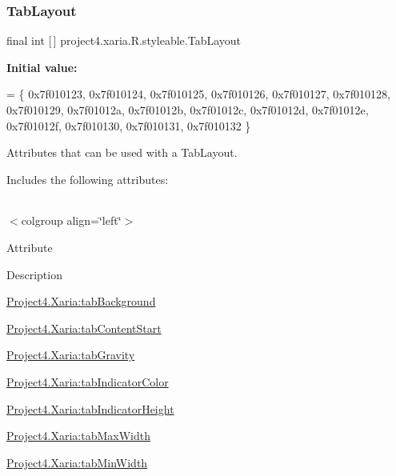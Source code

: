 \subsubsection{\texorpdfstring{Tab\+Layout}{TabLayout}}
{\footnotesize\ttfamily final int \mbox{[}$\,$\mbox{]} project4.\+xaria.\+R.\+styleable.\+Tab\+Layout\hspace{0.3cm}{\ttfamily [static]}}

{\bfseries Initial value\+:}
\begin{DoxyCode}
= \{
            0x7f010123, 0x7f010124, 0x7f010125, 0x7f010126,
            0x7f010127, 0x7f010128, 0x7f010129, 0x7f01012a,
            0x7f01012b, 0x7f01012c, 0x7f01012d, 0x7f01012e,
            0x7f01012f, 0x7f010130, 0x7f010131, 0x7f010132
        \}
\end{DoxyCode}
Attributes that can be used with a Tab\+Layout. 

Includes the following attributes\+:

\tabulinesep=1mm
\begin{longtabu} spread 0pt [c]{*{0}{|X[-1]}|}
\hline
\end{longtabu}
$<$colgroup align=\char`\"{}left\char`\"{}$>$ 

Attribute

Description 

{\ttfamily \hyperlink{classproject4_1_1xaria_1_1R_1_1styleable_a548353c43398409fd3c9188c927aad79}{Project4.\+Xaria\+:tab\+Background}}

{\ttfamily \hyperlink{classproject4_1_1xaria_1_1R_1_1styleable_ab07111454d6d47d52b6dd2500f672524}{Project4.\+Xaria\+:tab\+Content\+Start}}

{\ttfamily \hyperlink{classproject4_1_1xaria_1_1R_1_1styleable_a8c418d804b5e15d65312566231ca7340}{Project4.\+Xaria\+:tab\+Gravity}}

{\ttfamily \hyperlink{classproject4_1_1xaria_1_1R_1_1styleable_a87c9501d7b9b1c4efdf9fd753a3b2a07}{Project4.\+Xaria\+:tab\+Indicator\+Color}}

{\ttfamily \hyperlink{classproject4_1_1xaria_1_1R_1_1styleable_aef58cd9fb4e80a28f816ba0af7d84799}{Project4.\+Xaria\+:tab\+Indicator\+Height}}

{\ttfamily \hyperlink{classproject4_1_1xaria_1_1R_1_1styleable_a98754c74e515696696a25d422e921ca4}{Project4.\+Xaria\+:tab\+Max\+Width}}

{\ttfamily \hyperlink{classproject4_1_1xaria_1_1R_1_1styleable_a1999d406b522edbecdcd457eab2b11c7}{Project4.\+Xaria\+:tab\+Min\+Width}}

